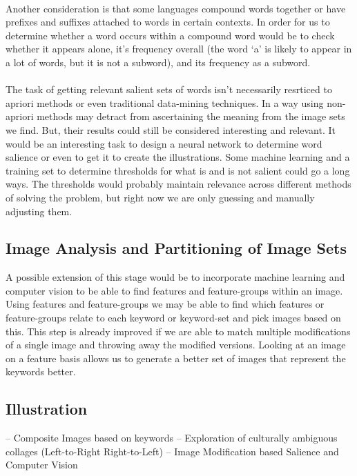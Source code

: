 \documentclass[12pt]{article}
\begin{document}
\paragraph{}
Another consideration is that some languages compound words together or have prefixes and suffixes attached to words in certain contexts. 
In order for us to determine whether a word occurs within a compound word would be to check whether it appears alone, 
it's frequency overall (the word `a' is likely to appear in a lot of words, but it is not a subword), and its frequency as a subword.
\paragraph{}
The task of getting relevant salient sets of words isn't necessarily resrticed to apriori methods or even traditional 
data-mining techniques. In a way using non-apriori methods may detract from ascertaining the meaning from the image sets 
we find. But, their results could still be considered interesting and relevant. It would be an interesting task to design 
a neural network to determine word salience or even to get it to create the illustrations. Some machine learning and a 
training set to determine thresholds for what is and is not salient could go a long ways. The thresholds would probably 
maintain relevance across different methods of solving the problem, but right now we are only guessing and manually 
adjusting them.

\subsection{Image Analysis and Partitioning of Image Sets}
A possible extension of this stage would be to incorporate machine learning and computer vision to be able to find 
features and feature-groups within an image. Using features and feature-groups we may be able to find which features 
or feature-groups relate to each keyword or keyword-set and pick images based on this. This step is already improved 
if we are able to match multiple modifications of a single image and throwing away the modified versions. Looking at 
an image on a feature basis allows us to generate a better set of images that represent the keywords better.

\subsection{Illustration}
-- Composite Images based on keywords
-- Exploration of culturally ambiguous collages (Left-to-Right Right-to-Left)
-- Image Modification based Salience and Computer Vision
\end{document}
